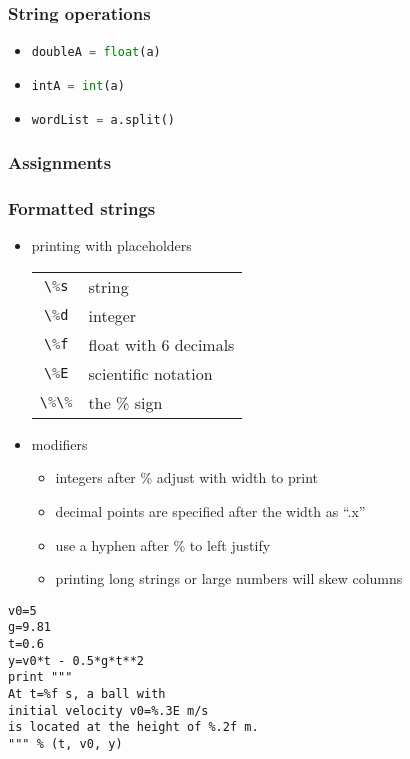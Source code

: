 \documentclass[xcolor=table,10pt,final]{beamer}
\begin{document}
\begin{frame}
  \frametitle{String operations}
  \begin{itemize}
    \item \lstinline[language=python]|doubleA = float(a)|
    \item \lstinline[language=python]|intA = int(a)|
    \item \lstinline[language=python]|wordList = a.split()|
  \end{itemize}
\end{frame}

\begin{frame}
  \frametitle{Assignments}
\end{frame}



\begin{frame}[fragile]
  \frametitle{Formatted strings}
  \begin{itemize}
    \item printing with placeholders
      \begin{table}
        \begin{tabular}{cl}
          \lstinline[language=python]|\%s| & string\\
          \lstinline[language=python]|\%d| & integer\\
          \lstinline[language=python]|\%f| & float with 6 decimals\\
          \lstinline[language=python]|\%E| & scientific notation\\
          \lstinline[language=python]|\%\%| & the \% sign
        \end{tabular}
      \end{table}
    \item modifiers
      \begin{itemize}
        \item integers after \% adjust with width to print
        \item decimal points are specified after the width as ``.x''
        \item use a hyphen after \% to left justify
        \item printing long strings or large numbers will skew columns
      \end{itemize}
  \end{itemize}
\begin{lstlisting}[langage=python]
v0=5
g=9.81
t=0.6
y=v0*t - 0.5*g*t**2
print """
At t=%f s, a ball with
initial velocity v0=%.3E m/s
is located at the height of %.2f m.
""" % (t, v0, y)
\end{lstlisting}
\end{frame}
\end{document}
